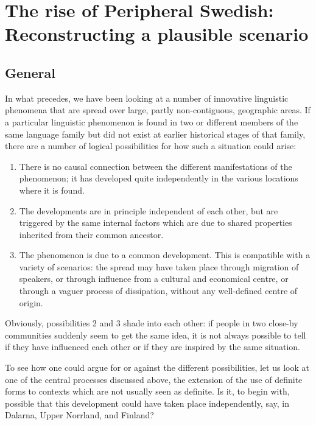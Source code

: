 
\chapter{The rise of Peripheral Swedish: Reconstructing a plausible scenario}
\section{General}
\label{sec:6.1}

In what precedes, we have been looking at a number of innovative linguistic phenomena that are spread over large, partly non-contiguous, geographic areas. If a particular linguistic phenomenon is found in two or different members of the same language family but did not exist at earlier historical stages of that family, there are a number of logical possibilities for how such a situation could arise:  

\begin{enumerate}
\item  
There is no causal connection between the different manifestations of the phenomenon; it has developed quite independently in the various locations where it is found. 
  
\item  
The developments are in principle independent of each other, but are triggered by the same internal factors which are due to shared properties inherited from their common ancestor. 
 
\item  
The phenomenon is due to a common development. This is compatible with a variety of scenarios: the spread may have taken place through migration of speakers, or through influence from a cultural and economical centre, or through a vaguer process of dissipation, without any well-defined centre of origin. 
\end{enumerate}



Obviously, possibilities 2 and 3 shade into each other: if people in two close-by communities suddenly seem to get the same idea, it is not always possible to tell if they have influenced each other or if they are inspired by the same situation. 

To see how one could argue for or against the different possibilities, let us look at one of the central processes discussed above, the extension of the use of definite forms to contexts which are not usually seen as definite. Is it, to begin with, possible that this development could have taken place independently, say, in Dalarna, Upper Norrland, and Finland? 

